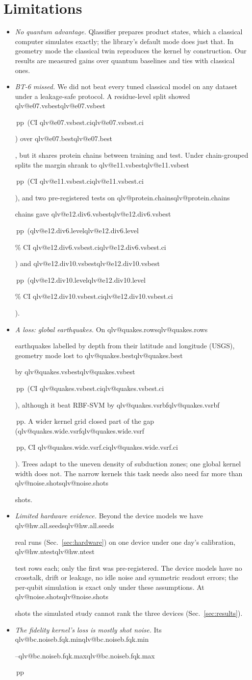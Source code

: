 \documentclass[aps,pra,reprint,superscriptaddress,nofootinbib,longbibliography]{revtex4-2}
\makeatletter
\newcommand{\val}[1]{\ifcsname qlv@#1\endcsname\csname qlv@#1\endcsname\else
  \PackageError{qlassifier}{No value '#1'}{Run python scripts/paper_tables.py}\fi}
\newcommand{\pp}{\,pp}
\makeatother
\begin{document}
\section{Limitations}
\label{sec:limits}

\begin{itemize}
\item \textit{No quantum advantage.} Qlassifier prepares product states, which a classical computer simulates exactly;
  the library's default mode does just that. In geometry mode the classical twin reproduces the kernel by construction.
  Our results are measured gains over quantum baselines and ties with classical ones.
\item \textit{BT-6 missed.} We did not beat every tuned classical model on any dataset under a leakage-safe protocol.
  A residue-level split showed \val{e07.vsbest}\pp\ (CI \val{e07.vsbest.ci}) over \val{e07.best}, but it shares
  protein chains between training and test. Under chain-grouped splits the margin shrank to \val{e11.vsbest}\pp\ (CI
  \val{e11.vsbest.ci}), and two pre-registered tests on \val{protein.chains} chains gave \val{e12.div6.vsbest}\pp\ (\val{e12.div6.level}\% CI
  \val{e12.div6.vsbest.ci}) and \val{e12.div10.vsbest}\pp\ (\val{e12.div10.level}\% CI \val{e12.div10.vsbest.ci}).
\item \textit{A loss: global earthquakes.} On \val{quakes.rows} earthquakes labelled by depth from their latitude and
  longitude (USGS), geometry mode lost to \val{quakes.best} by \val{quakes.vsbest}\pp\ (CI \val{quakes.vsbest.ci}),
  although it beat RBF-SVM by \val{quakes.vsrbf}\pp. A wider kernel grid closed part of the gap
  (\val{quakes.wide.vsrf}\pp, CI \val{quakes.wide.vsrf.ci}). Trees adapt to the uneven density of subduction zones;
  one global kernel width does not. The narrow kernels this task needs also need far more than \val{noise.shots} shots.
\item \textit{Limited hardware evidence.} Beyond the device models we have \val{hw.all.seeds} real runs
  (Sec.~\ref{sec:hardware}) on one device under one day's calibration, \val{hw.ntest} test rows each; only the first
  was pre-registered. The device models have no crosstalk, drift or leakage,
  no idle noise and symmetric readout errors; the per-qubit simulation is exact only under these assumptions. At
  \val{noise.shots} shots the simulated study cannot rank the three devices (Sec.~\ref{sec:results}).
\item \textit{The fidelity kernel's loss is mostly shot noise.} Its \val{bc.noiseb.fqk.min}--\val{bc.noiseb.fqk.max}\pp\

\end{itemize}
\end{document}
